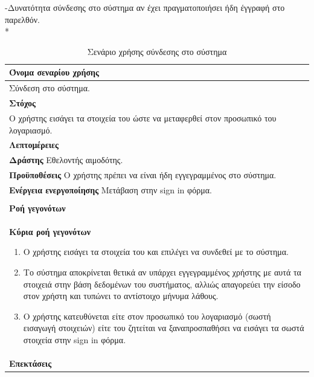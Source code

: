 -Δυνατότητα σύνδεσης στο σύστημα αν έχει πραγματοποιήσει ήδη έγγραφή στο παρελθόν.
\\*
\begin{table}[H]	
	\begin{center}
	    \begin{tabular}{|p{\dimexpr \linewidth-2\tabcolsep}|}
	    \hline
	    \rowcolor{grayy}
	    \textbf{Όνομα σεναρίου χρήσης}
	    \\ \hline    
	    Σύνδεση στο σύστημα.
	     \\ \hline
	    \rowcolor{grayy}
	    \textbf{\textbf{Στόχος}}
	    \\ \hline
		Ο χρήστης εισάγει τα στοιχεία του ώστε να μεταφερθεί στον προσωπικό του λογαριασμό.
	    \\ \hline
	    \rowcolor{grayy}
	    \textbf{Λεπτομέρειες}
	    \\ \hline
		\textbf{Δράστης} Εθελοντής αιμοδότης.
		\\*
		\textbf{Προϋποθέσεις} Ο χρήστης πρέπει να είναι ήδη εγγεγραμμένος στο σύστημα.
		\\*
		\textbf{Ενέργεια ενεργοποίησης} Μετάβαση στην sign in φόρμα.
		\\ \hline
	    \\ \hline
		\rowcolor{grayy}    
	    \textbf{Ροή γεγονότων}
	    \\* 
		\textbf{Κύρια ροή γεγονότων}
		\begin{enumerate}
			\item	Ο χρήστης εισάγει τα στοιχεία του και επιλέγει να συνδεθεί με το σύστημα.
			\item Το σύστημα αποκρίνεται θετικά αν υπάρχει εγγεγραμμένος  χρήστης με αυτά τα στοιχειά στην βάση δεδομένων του συστήματος, αλλιώς απαγορεύει
		την είσοδο στον χρήστη και τυπώνει το αντίστοιχο μήνυμα λάθους.
			\item	Ο χρήστης κατευθύνεται είτε στον προσωπικό του λογαριασμό (σωστή εισαγωγή στοιχειών) είτε του ζητείται να ξαναπροσπαθήσει να εισάγει τα σωστά στοιχεία στην sign in φόρμα.
		\end{enumerate}
		\\*
		\textbf{Επεκτάσεις}
		\\ \hline
	    \end{tabular}
	    \caption{Σενάριο χρήσης σύνδεσης στο σύστημα}
	    \label{tab:user_sign_in} 	
	\end{center}
\end{table}

